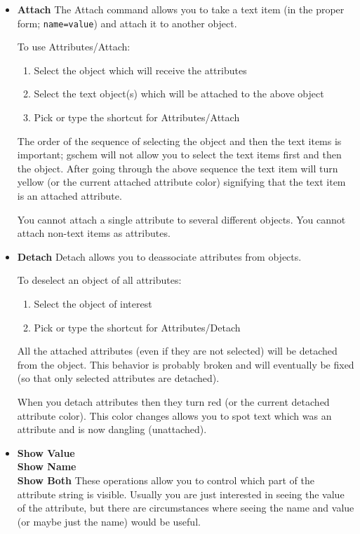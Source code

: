 \documentclass{article}
\begin{document}
\begin{itemize}
\item {\bf Attach} The Attach command allows you to take a text item
  (in the proper form; {\tt name=value}) and attach it to another object.
  
  To use Attributes/Attach:
\begin{enumerate}                
\item Select the object which will receive the attributes
\item Select the text object(s) which will be attached to the above
  object
\item Pick or type the shortcut for Attributes/Attach
\end{enumerate}
The order of the sequence of selecting the object and then the text
items is important; gschem will not allow you to select the text items
first and then the object.  After going through the above sequence the
text item will turn yellow (or the current attached attribute color)
signifying that the text item is an attached attribute.

You cannot attach a single attribute to several different objects.
You cannot attach non-text items as attributes.

\item {\bf Detach} Detach allows you to deassociate attributes from
  objects.
  
  To deselect an object of all attributes:
\begin{enumerate}
\item Select the object of interest
\item Pick or type the shortcut for Attributes/Detach
\end{enumerate}                
All the attached attributes (even if they are not selected) will be
detached from the object.  This behavior is probably broken and will
eventually be fixed (so that only selected attributes are detached).

When you detach attributes then they turn red (or the current detached
attribute color).  This color changes allows you to spot text which
was an attribute and is now dangling (unattached).

\item {\bf Show Value}\\
  {\bf Show Name} \\
  {\bf Show Both} These operations allow you to control which part of
  the attribute string is visible.  Usually you are just interested in
  seeing the value of the attribute, but there are circumstances where
  seeing the name and value (or maybe just the name) would be useful.
  

\end{itemize}
\end{document}
